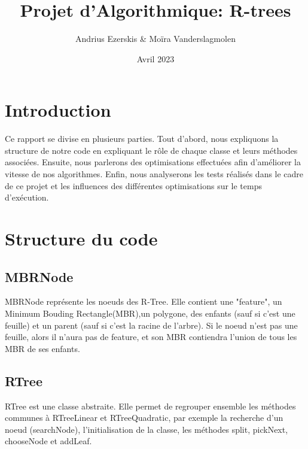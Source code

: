 \documentclass[utf8]{article}
\begin{document}
\begin{titlepage}


    \author{Andrius Ezerskis \& Moïra Vanderslagmolen}
    \title{Projet d'Algorithmique: R-trees}
    \date{Avril 2023}
    \maketitle
\end{titlepage}
\tableofcontents
\newpage
\begin{large}


    \section{Introduction}
    \indent
    \par
    Ce rapport se divise en plusieurs parties. Tout d'abord, nous expliquons la
    structure de notre code en expliquant le rôle de chaque classe et leurs
    méthodes associées. Ensuite, nous parlerons des optimisations effectuées afin
    d'améliorer la vitesse de nos algorithmes. Enfin, nous analyserons les tests
    réalisés dans le cadre de ce projet et les influences des différentes
    optimisations sur le temps d'exécution.
    \par
    \section{Structure du code}

    \par
    \subsection{MBRNode}
    \indent
    \par
    MBRNode représente les noeuds des R-Tree. Elle contient une "feature", un Minimum Bouding Rectangle(MBR),un polygone,
    des enfants (sauf si c'est une feuille) et un parent (sauf si c'est la racine de
    l'arbre). Si le noeud n'est pas une feuille, alors il n'aura pas de feature,
    et son MBR contiendra l'union de tous les MBR de ses enfants.
    \par

    \subsection{RTree}\label{RTree}
    \indent
    \par
    RTree est une classe abstraite. Elle permet de regrouper ensemble les méthodes
    communes à RTreeLinear et RTreeQuadratic, par exemple la recherche d'un noeud
    (searchNode), l'initialisation de la classe, les méthodes split, pickNext,
    chooseNode et addLeaf.
    \par


\end{large}
\end{document}
